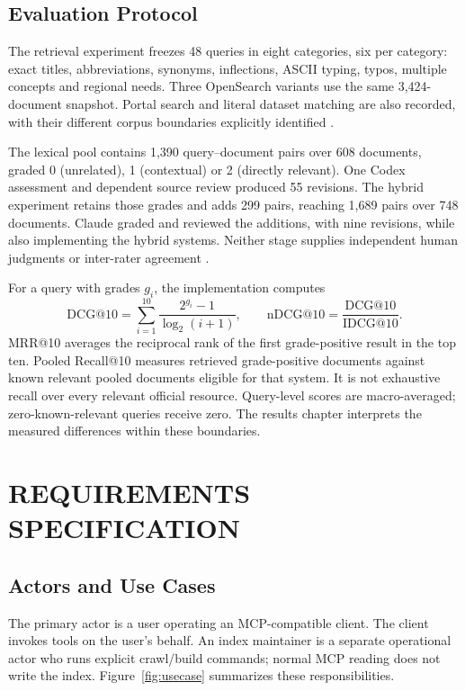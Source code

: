 \documentclass[a4paper,12pt]{report}
\begin{document}
\section{Evaluation Protocol}
The retrieval experiment freezes 48 queries in eight categories, six per category: exact titles, abbreviations, synonyms, inflections, ASCII typing, typos, multiple concepts and regional needs. Three OpenSearch variants use the same 3,424-document snapshot. Portal search and literal dataset matching are also recorded, with their different corpus boundaries explicitly identified \cite{evaluation}.

The lexical pool contains 1,390 query--document pairs over 608 documents, graded 0 (unrelated), 1 (contextual) or 2 (directly relevant). One Codex assessment and dependent source review produced 55 revisions. The hybrid experiment retains those grades and adds 299 pairs, reaching 1,689 pairs over 748 documents. Claude graded and reviewed the additions, with nine revisions, while also implementing the hybrid systems. Neither stage supplies independent human judgments or inter-rater agreement \cite{hybrid}.

For a query with grades $g_i$, the implementation computes
\begin{equation}
 \mathrm{DCG@10}=\sum_{i=1}^{10}\frac{2^{g_i}-1}{\log_2(i+1)},
 \qquad \mathrm{nDCG@10}=\frac{\mathrm{DCG@10}}{\mathrm{IDCG@10}}.
\end{equation}
MRR@10 averages the reciprocal rank of the first grade-positive result in the top ten. Pooled Recall@10 measures retrieved grade-positive documents against known relevant pooled documents eligible for that system. It is not exhaustive recall over every relevant official resource. Query-level scores are macro-averaged; zero-known-relevant queries receive zero. The results chapter interprets the measured differences within these boundaries.

\chapter{REQUIREMENTS SPECIFICATION}
\section{Actors and Use Cases}
The primary actor is a user operating an MCP-compatible client. The client invokes tools on the user's behalf. An index maintainer is a separate operational actor who runs explicit crawl/build commands; normal MCP reading does not write the index. Figure~\ref{fig:usecase} summarizes these responsibilities.
\end{document}
